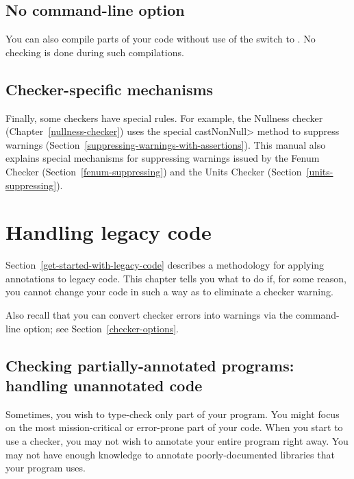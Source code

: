 \section{No  command-line option\label{no-processor}}

You can also compile parts of your code without use of the
 switch to .  No checking is done during
such compilations.

\section{Checker-specific mechanisms\label{checker-specific-suppression}}

Finally, some checkers have special rules.  For example, the Nullness
checker (Chapter~\ref{nullness-checker}) uses
the special \<castNonNull> method to suppress warnings
(Section~\ref{suppressing-warnings-with-assertions}).
This manual also explains special mechanisms for
suppressing warnings issued by the Fenum Checker
(Section~\ref{fenum-suppressing}) and the Units Checker
(Section~\ref{units-suppressing}).



\htmlhr
\chapter{Handling legacy code\label{legacy-code}}

Section~\ref{get-started-with-legacy-code} describes a methodology for
applying annotations to legacy code.  This chapter tells you what to do if,
for some reason, you cannot change your code in such a way as to eliminate
a checker warning.

Also recall that you can convert checker errors into warnings via the
 command-line option; see Section~\ref{checker-options}.


\section{Checking partially-annotated programs:  handling unannotated code\label{unannotated-code}}

Sometimes, you wish to type-check only part of your program.
You might focus on the most mission-critical or error-prone part of your
code.  When you start to use a checker, you may not wish to annotate
your entire program right away.
You may not have
enough knowledge to annotate poorly-documented libraries that your program uses.

